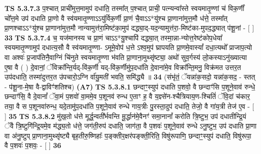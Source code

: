 \documentclass[17pt]{extarticle}
\begin{document}
                  \newline
                                \textbf{ TS 5.3.7.3} \newline
                  प॒श्चात् प्राची॑मुत्त॒मामुप॑ दधाति॒ तस्मा᳚त् प॒श्चात् प्राची॒ पत्न्यन्वा᳚स्ते स्वयमातृ॒ण्णां च॑ विक॒र्णीं चो᳚त्त॒मे उप॑ दधाति प्रा॒णो वै स्व॑यमातृ॒ण्णाऽऽयु॑र्विक॒र्णी प्रा॒णं चै॒वाऽऽ*यु॑श्च प्रा॒णाना॑मुत्त॒मौ ध॑त्ते॒ तस्मा᳚त् प्रा॒णश्चाऽऽ*यु॑श्च प्रा॒णाना॑मुत्त॒मौ नान्यामुत्त॑रा॒मिष्ट॑का॒मुप॑ दद्ध्या॒द्-यद॒न्यामुत्त॑रा॒-मिष्ट॑का-मुपद॒द्ध्यात् प॑शू॒नां - [  ] \textbf{  33} \newline
                  \newline
                                \textbf{ TS 5.3.7.4} \newline
                  च॒ यज॑मानस्य च प्रा॒णं चाऽऽ*यु॒श्चापि॑ दद्ध्या॒त् तस्मा॒न्ना-न्योत्त॒रेष्ट॑कोप॒धेया᳚ स्वयमातृ॒ण्णामुप॑ दधात्य॒सौ वै स्व॑यमातृ॒ण्णा- ऽमूमे॒वोप॑ ध॒त्ते ऽश्व॒मुप॑ घ्रापयति प्रा॒णमे॒वास्यां᳚ दधा॒त्यथो᳚ प्राजाप॒त्यो वा अश्वः॑ प्र॒जाप॑तिनै॒वाग्निं चि॑नुते स्वयमातृ॒ण्णा भ॑वति प्रा॒णाना॒मुथ्सृ॑ष्ट्या॒ अथो॑ सुव॒र्गस्य॑ लो॒कस्याऽनु॑ख्यात्या ए॒षा वै ( ) दे॒वानां॒ ॅविक्रा᳚न्ति॒र्यद्-वि॑क॒र्णी यद्-वि॑क॒र्णीमु॑प॒दधा॑ति दे॒वाना॑मे॒व विक्रा᳚न्ति॒मनु॒ विक्र॑मत उत्तर॒त उप॑दधाति॒ तस्मा॑दुत्तर॒त उ॑पचारो॒ऽग्नि र्वा॑यु॒मती॑ भवति॒ समि॑द्ध्यै ॥ \textbf{  34} \newline
                  \newline
                      (संभृ॑तं॒ ॅयन्ना॑क॒सदो॒ यन्ना॑क॒सद॒ - स्तत् - प॑शू॒ना-मे॒षा वै-द्वाविꣳ॑शतिश्च)  \textbf{(A7)} \newline \newline
                                        \textbf{ TS 5.3.8.1} \newline
                  छन्दाꣳ॒॒स्युप॑ दधाति प॒शवो॒ वै छन्दाꣳ॑सि प॒शूने॒वाव॑ रुन्धे॒ छन्दाꣳ॑सि॒ वै दे॒वानां᳚ ॅवा॒मं प॒शवो॑ वा॒ममे॒व प॒शूनव॑ रुन्ध ए॒ताꣳ ह॒ वै य॒ज्ञ्से॑न-श्चैत्रियाय॒ण-श्चितिं॑ ॅवि॒दां च॑कार॒ तया॒ वै स प॒शूनवा॑रुन्ध॒ यदे॒तामु॑प॒दधा॑ति प॒शूने॒वाव॑ रुन्धे गाय॒त्रीः पु॒रस्ता॒दुप॑ दधाति॒ तेजो॒ वै गा॑य॒त्री तेज॑ ए॒व - [  ] \textbf{  35} \newline
                  \newline
                                \textbf{ TS 5.3.8.2} \newline
                  मु॑ख॒तो ध॑त्ते मूर्द्ध॒न्वती᳚र्भवन्ति मू॒र्द्धान॑मे॒वैनꣳ॑ समा॒नानां᳚ करोति त्रि॒ष्टुभ॒ उप॑ दधातीन्द्रि॒यं ॅवै त्रि॒ष्टुगि॑न्द्रि॒यमे॒व म॑द्ध्य॒तो ध॑त्ते॒ जग॑ती॒रुप॑ दधाति॒ जाग॑ता॒ वै प॒शवः॑ प॒शूने॒वाव॑ रुन्धे ऽनु॒ष्टुभ॒ उप॑ दधाति प्रा॒णा वा अ॑नु॒ष्टुप् प्रा॒णाना॒मुथ्सृ॑ष्ट्यै बृह॒तीरु॒ष्णिहाः᳚ प॒ङ्क्तीर॒क्षर॑पङ्क्ती॒रिति॒ विषु॑रूपाणि॒ छन्दाꣳ॒॒स्युप॑ दधाति॒ विषु॑रूपा॒ वै प॒शवः॑ प॒शवः॒ - [  ] \textbf{  36} \newline
\end{document}
